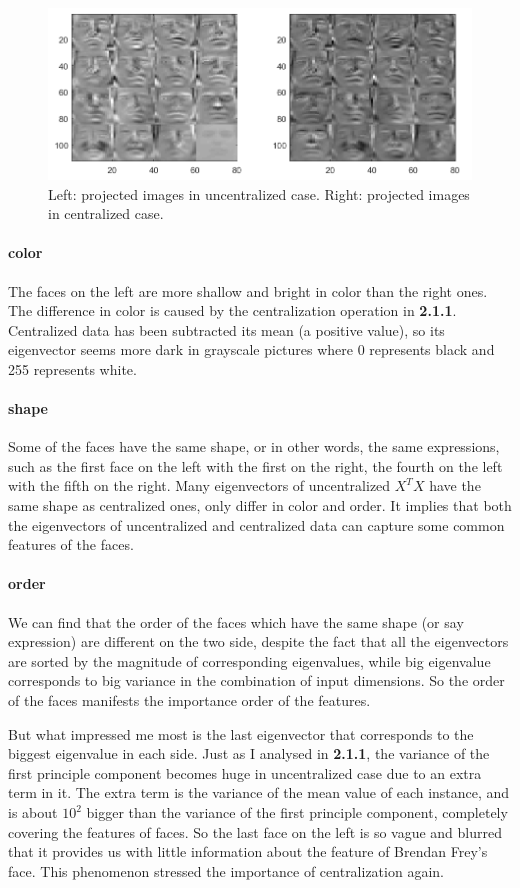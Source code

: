 \documentclass{article}
\begin{document}
\begin{figure}[H]
	\centering
	\includegraphics[scale=0.7]{figure11}
	\caption{Left: projected images in uncentralized case. Right: projected images in centralized case.}
	\label{fig11}
\end{figure}

\paragraph{color} The faces on the left are more shallow and bright in color than the right ones. The difference in color is caused by the centralization operation in \textbf{2.1.1}. Centralized data has been subtracted its mean (a positive value), so its eigenvector seems more dark in grayscale pictures where 0 represents black and 255 represents white.

\paragraph{shape} Some of the faces have the same shape, or in other words, the same expressions, such as the first face on the left with the first on the right, the fourth on the left with the fifth on the right. Many eigenvectors of uncentralized $X^TX$ have the same shape as centralized ones, only differ in color and order. It implies that both the eigenvectors of uncentralized and centralized data can capture some common features of the faces.

\paragraph{order} We can find that the order of the faces which have the same shape (or say expression) are different on the two side, despite the fact that all the eigenvectors are sorted by the magnitude of corresponding eigenvalues, while big eigenvalue corresponds to big variance in the combination of input dimensions. So the order of the faces manifests the importance order of the features.\par
But what impressed me most is the last eigenvector that corresponds to the biggest eigenvalue in each side. Just as I analysed in \textbf{2.1.1}, the variance of the first principle component becomes huge in uncentralized case due to an extra term in it. The extra term is the variance of the mean value of each instance, and is about $10^2$ bigger than the variance of the first principle component, completely covering the features of faces. So the last face on the left is so vague and blurred that it provides us with little information about the feature of Brendan Frey’s face. This phenomenon stressed the importance of centralization again.
\end{document}
